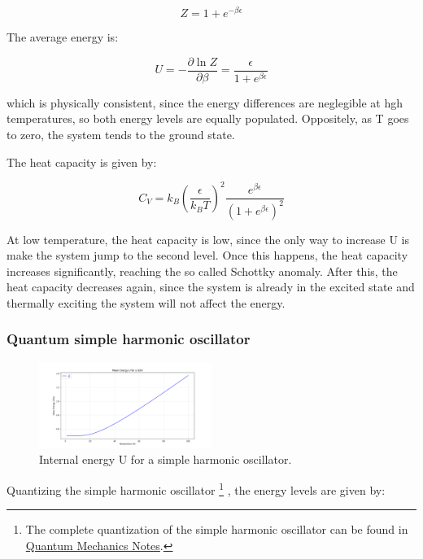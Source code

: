 \documentclass{article}
\begin{document}
\begin{equation}
    Z=1+e^{-\beta\epsilon}
\end{equation}

The average energy is:

\begin{equation}
    U=-\frac{\partial\ln{Z}}{\partial\beta}= \frac{\epsilon}{1+e^{\beta\epsilon}}
\end{equation}

which is physically consistent, since the energy differences are neglegible at hgh temperatures,
so both energy levels are equally populated. Oppositely, as T goes to zero, the system tends to the ground state.

The heat capacity is given by:

\begin{equation}
    C_V=k_B\left(\frac{\epsilon}{k_BT}\right)^2\frac{e^{\beta\epsilon}}{(1+e^{\beta\epsilon})^2}
\end{equation}

At low temperature, the heat capacity is low, since the only way to increase
U is make the system jump to the second level. Once this happens, the heat capacity increases significantly, reaching the so called Schottky anomaly.
After this, the heat capacity decreases again, since the system is already in the excited state and thermally exciting the system will not affect the energy.


\subsubsection{Quantum simple harmonic oscillator}

\begin{figure}[h!]
    \centering
    \includegraphics[width=0.5\textwidth]{images/statistical-physics/u-soh.png}
    \caption{
        Internal energy U for a simple harmonic oscillator.
    }
    \label{fig:u-soh}
\end{figure}

Quantizing the simple harmonic oscillator
\footnote{
    The complete quantization of the simple harmonic oscillator can be found in
    \href{https://cesaresabattini.github.io/Physics-Lecture-Notes/}{Quantum Mechanics Notes}.
}
, the energy levels are given by:
\end{document}
